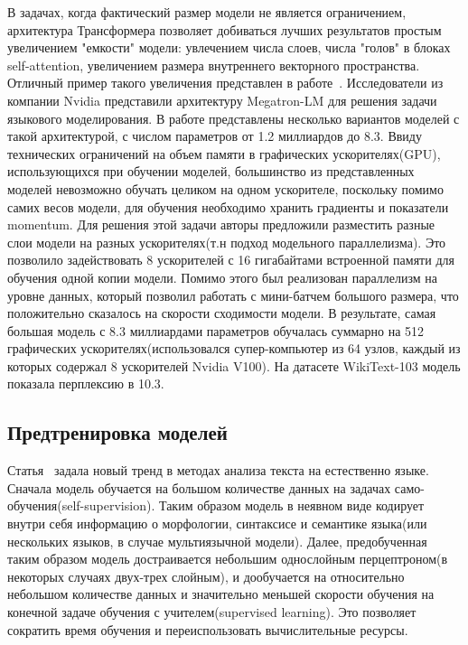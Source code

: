 \par В задачах, когда фактический размер модели не является ограничением, архитектура Трансформера позволяет добиваться лучших результатов простым увеличением "емкости" модели: увлечением числа слоев, числа "голов" в блоках self-attention, увеличением размера внутреннего векторного пространства. Отличный пример такого увеличения представлен в работе~\cite{megatron-lm}. Исследователи из компании Nvidia представили архитектуру Megatron-LM для решения задачи языкового моделирования. В работе представлены несколько вариантов моделей с такой архитектурой, с числом параметров от 1.2 миллиардов до 8.3. Ввиду технических ограничений на объем памяти в графических ускорителях(GPU), использующихся при обучении моделей, большинство из представленных моделей невозможно обучать целиком на одном ускорителе, поскольку помимо самих весов модели, для обучения необходимо хранить градиенты и показатели momentum. Для решения этой задачи авторы предложили разместить разные слои модели на разных ускорителях(т.н подход модельного параллелизма). Это позволило задействовать 8 ускорителей с 16 гигабайтами встроенной памяти для обучения одной копии модели. Помимо этого был реализован параллелизм на уровне данных, который позволил работать с мини-батчем большого размера, что положительно сказалось на скорости сходимости модели. В результате, самая большая модель с 8.3 миллиардами параметров обучалась суммарно на 512 графических ускорителях(использовался супер-компьютер из 64 узлов, каждый из которых содержал 8 ускорителей Nvidia V100). На датасете WikiText-103 модель показала перплексию в 10.3.

\subsection{Предтренировка моделей}
\par Статья~\cite{bert} задала новый тренд в методах анализа текста на естественно языке. Сначала модель обучается на большом количестве данных на задачах само-обучения(self-supervision). Таким образом модель в неявном виде кодирует внутри себя информацию о морфологии, синтаксисе и семантике языка(или нескольких языков, в случае мультиязычной модели). Далее, предобученная таким образом модель достраивается небольшим однослойным перцептроном(в некоторых случаях двух-трех слойным), и дообучается на относительно небольшом количестве данных и значительно меньшей скорости обучения на конечной задаче обучения с учителем(supervised learning). Это позволяет сократить время обучения и переиспользовать вычислительные ресурсы.

